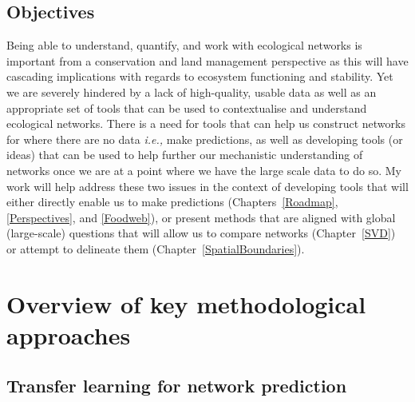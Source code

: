 \begin{refsection}
\subsection{Objectives}\label{objectives-and-hypotheses}

Being able to understand, quantify, and work with ecological networks is
important from a conservation and land management perspective as this
will have cascading implications with regards to ecosystem functioning
and stability. Yet we are severely hindered by a lack of high-quality,
usable data as well as an appropriate set of tools that can be used to
contextualise and understand ecological networks. There is a need for
tools that can help us construct networks for where there are no data
\emph{i.e.,} make predictions, as well as developing tools (or ideas) that
can be used to help further our mechanistic understanding of networks once
we are at a point where we have the large scale data to do so. My work will
help address these two issues in the context of developing tools that will
either directly enable us to make predictions (Chapters~\ref{Roadmap},
\ref{Perspectives}, and \ref{Foodweb}), or present methods that are aligned
with global (large-scale) questions that will allow us to compare networks
(Chapter~\ref{SVD}) or attempt to delineate them 
(Chapter~\ref{SpatialBoundaries}).

\section{Overview of key methodological approaches}

\subsection{Transfer learning for network prediction}\label{transfer-learning-for-network-prediction}


\end{refsection}
